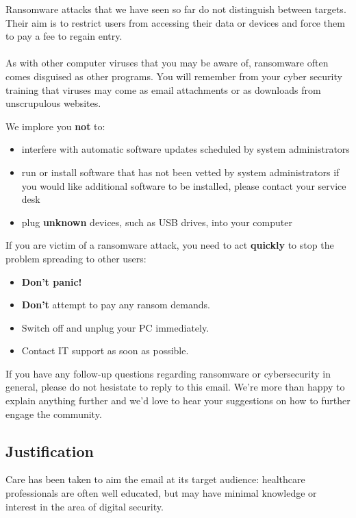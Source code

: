 \documentclass{article}
\begin{document}
Ransomware attacks that we have seen so far do not distinguish between targets. Their aim is to restrict users from accessing their data or devices and force them to pay a fee to regain entry.
\\\\
As with other computer viruses that you may be aware of, ransomware often comes disguised as other programs. You will remember from your cyber security training that viruses may come as email attachments or as downloads from unscrupulous websites.

We implore you \textbf{not} to:
\begin{itemize}
	\item interfere with automatic software updates scheduled by system administrators
	\item run or install software that has not been vetted by system administrators
		if you would like additional software to be installed, please contact your service desk
	\item plug \textbf{unknown} devices, such as USB drives, into your computer
\end{itemize}

If you are victim of a ransomware attack, you need to act \textbf{quickly} to stop the problem spreading to other users:
\begin{itemize}
	\item \textbf{Don't panic!}
	\item \textbf{Don't} attempt to pay any ransom demands.
	\item Switch off and unplug your PC immediately.
	\item Contact IT support as soon as possible.
\end{itemize}

If you have any follow-up questions regarding ransomware or cybersecurity in general, please do not hesistate to reply to this email. We're more than happy to explain anything further and we'd love to hear your suggestions on how to further engage the community.

\subsection{Justification}%
Care has been taken to aim the email at its target audience: healthcare professionals are often well educated, but may have minimal knowledge or interest in the area of digital security.
\end{document}
